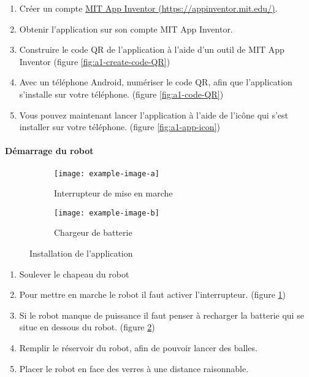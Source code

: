 \begin{enumerate}
    \item Créer un compte \href{https://appinventor.mit.edu/}{MIT App Inventor (https://appinventor.mit.edu/)}.
    \item Obtenir l’application sur son compte MIT App Inventor.
    \item Construire le code QR de l’application à l’aide d’un outil de MIT App Inventor (figure \ref{fig:a1-create-code-QR})
    \item Avec un téléphone Android, numériser le code QR, afin que l’application s’installe sur votre téléphone. (figure \ref{fig:a1-code-QR})
    \item Vous pouvez maintenant lancer l’application à l’aide de l’icône qui s’est installer sur votre téléphone. (figure \ref{fig:a1-app-icon})
\end{enumerate}

\paragraph{Démarrage du robot}

\begin{wrapfigure}{r}{0.5\linewidth}
    \centering

    \begin{subfigure}{0.4\linewidth}
        \centering
        \texttt{[image: example-image-a]}
        \caption{Interrupteur de mise en marche}
        \label{fig:a1-interrupteur}
    \end{subfigure}
    \begin{subfigure}{0.4\linewidth}
        \centering
        \texttt{[image: example-image-b]}
        \caption{Chargeur de batterie}
        \label{fig:a1-chargeur-batterie}
    \end{subfigure}

    \caption{Installation de l’application}
    \label{fig:template-example-flottante}
\end{wrapfigure}

\begin{enumerate}
    \item Soulever le chapeau du robot 
    \item Pour mettre en marche le robot il faut activer l’interrupteur. (figure \ref{fig:a1-interrupteur})
    \item Si le robot manque de puissance il faut penser à recharger la batterie qui se situe en dessous du robot. (figure \ref{fig:a1-chargeur-batterie})
    \item Remplir le réservoir du robot, afin de pouvoir lancer des balles.
    \item Placer le robot en face des verres à une distance raisonnable.
\end{enumerate}

